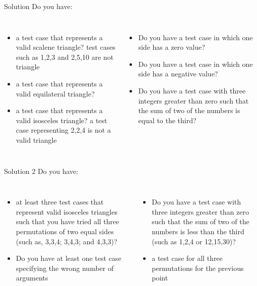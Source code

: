 \documentclass{beamer}
\begin{document}
\begin{frame}{Solution}
Do you have:
\begin{columns}
	\begin{itemize}
      \item a test case that represents a valid scalene triangle? \alert{test cases
      such as 1,2,3 and 2,5,10 are not triangle}
      \item a test case that represents a valid equilateral triangle?
      \item a test case that represents a valid isosceles triangle? \alert{a
      test case representing 2,2,4 is not a valid triangle}     
    \end{itemize}
	\begin{itemize}
      \item Do you have a test case in which one side has a zero value?
      \item Do you have a test case in which one side has a negative value?
      \item Do you have a test case with three integers greater than zero such
      that the sum of two of the numbers is equal to the third?
    \end{itemize}
\end{columns}
\end{frame}

\begin{frame}{Solution 2}
Do you have:
\begin{columns}
	\begin{itemize}
      \item at least three test cases that represent valid isosceles triangles
      such that you have tried all three permutations of two equal sides (such as, 3,3,4; 3,4,3; and 4,3,3)?      
	  \item Do you have at least one test case specifying the wrong number of arguments
    \end{itemize}
	\begin{itemize}
      \item Do you have a test case with three integers greater than zero such
      that the sum of two of the numbers is less than the third (such as 1,2,4
      or 12,15,30)?
      \item a test case for all three permutations for the previous point
    \end{itemize}
\end{columns}
\end{frame}
\end{document}
